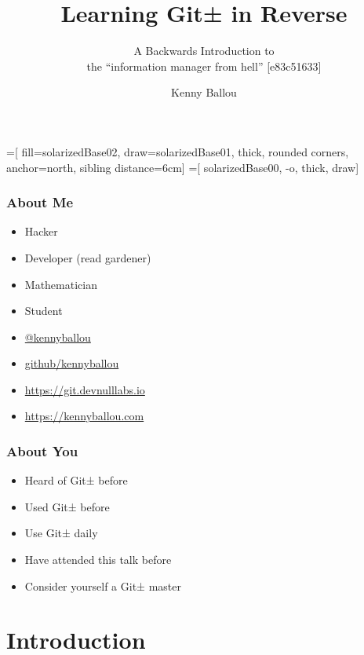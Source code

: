 \documentclass{beamer}
\title{Learning Git± in Reverse}
\subtitle{A Backwards Introduction to \\{} the ``information manager from
hell'' [e83c51633]}
\author[Ballou]{Kenny Ballou}
\institute[/dev/null]{/dev/null > labs}
\begin{document}
=[%
    fill=solarizedBase02,
    draw=solarizedBase01,
    thick,
    rounded corners,
    anchor=north,
    sibling distance=6cm]
=[%
    solarizedBase00,
    -o,
    thick,
    draw]


\begin{frame}[label=titleslide]
\titlepage{}
\end{frame}

\begin{frame}
\tableofcontents[subsectionstyle=hide]
\end{frame}

\begin{frame}
\frametitle{About Me}
\begin{itemize}
\item{Hacker}
\item{Developer (read gardener)}
\item{Mathematician}
\item{Student}
\item{\href{https://twitter.com/kennyballou}{@kennyballou}}
\item{\href{https://github.com}{github/kennyballou}}
\item{\url{https://git.devnulllabs.io}}
\item{\url{https://kennyballou.com}}
\end{itemize}

\end{frame}

\begin{frame}
  \frametitle{About You}
  \begin{itemize}
  \item<2->{Heard of Git± before}
  \item<3->{Used Git± before}
  \item<4->{Use Git± daily}
  \item<5->{Have attended this talk before}
  \item<6->{Consider yourself a Git± master}
  \end{itemize}
\end{frame}

\section{Introduction}
\end{document}
